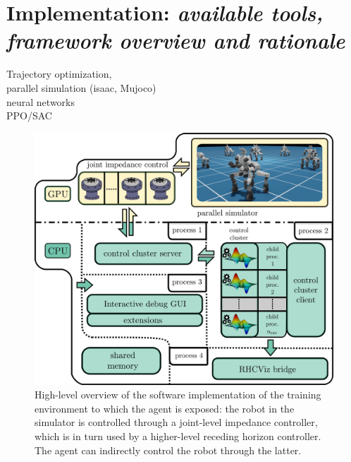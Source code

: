 \section{Implementation: \textnormal{\textit{available tools, framework overview and rationale}}}
Trajectory optimization, \\
parallel simulation (isaac, Mujoco)\\
neural networks\\
PPO/SAC\\

\begin{figure}[t]
	\centering
	\includegraphics[width=1.0\columnwidth]{imgs/cocluster_arch.pdf}
	\caption{High-level overview of the software implementation of the training environment to which the agent is exposed: the robot in the simulator is controlled through a joint-level impedance controller, which is in turn used by a higher-level receding horizon controller. The agent can indirectly control the robot through the latter.}
	\label{fig:coclbridge_arch}
\end{figure}

\cite{rl:makoviychuk2021isaac}
\cite{rl:mujocoaccelereted2023}
\cite{frameworks:mittal2023orbit}
\cite{frameworks::horizon_to}

\cite{mystuff::lrhccontrol}
\cite{mystuff::omnirobogym}
\cite{mystuff::coclusterbridge}
\cite{mystuff::rhcviz}
\cite{mystuff::sharsoripcpp}